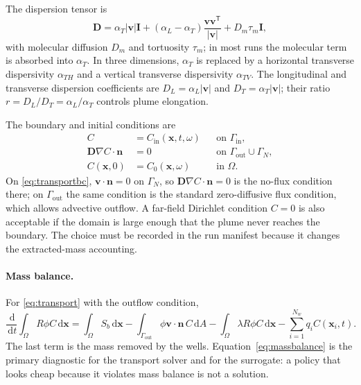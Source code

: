 \documentclass[11pt]{article}
\numberwithin{equation}{section}
\newcommand{\dd}{\,\mathrm{d}}
\newcommand{\abs}[1]{\left\lvert #1 \right\rvert}
\newcommand{\xx}{\mathbf{x}}
\newcommand{\vv}{\mathbf{v}}
\newcommand{\DD}{\mathbf{D}}
\newcommand{\nn}{\mathbf{n}}
\newcommand{\T}{\mathsf{T}}
\theoremstyle{plain}
\begin{document}
The dispersion tensor is
\begin{equation}
\label{eq:D2}
\DD=\alpha_T\abs{\vv}\mathbf{I}
+(\alpha_L-\alpha_T)\frac{\vv\vv^{\T}}{\abs{\vv}}
+D_m\tau_m\mathbf{I},
\end{equation}
with molecular diffusion $D_m$ and tortuosity $\tau_m$; in most runs the
molecular term is absorbed into $\alpha_T$.  In three dimensions,
$\alpha_T$ is replaced by a horizontal transverse dispersivity
$\alpha_{TH}$ and a vertical transverse dispersivity $\alpha_{TV}$.  The
longitudinal and transverse dispersion coefficients are
$D_L=\alpha_L\abs{\vv}$ and $D_T=\alpha_T\abs{\vv}$; their ratio
$r=D_L/D_T=\alpha_L/\alpha_T$ controls plume elongation.

The boundary and initial conditions are
\begin{equation}
\label{eq:transportbc}
\begin{aligned}
C&=C_{\mathrm{in}}(\xx,t,\omega)
&&\text{on }\Gamma_{\mathrm{in}},\\
\DD\nabla C\cdot\nn&=0
&&\text{on }\Gamma_{\mathrm{out}}\cup\Gamma_N,\\
C(\xx,0)&=C_0(\xx,\omega)&&\text{in }\Omega.
\end{aligned}
\end{equation}
On \eqref{eq:transportbc}, $\vv\cdot\nn=0$ on $\Gamma_N$, so
$\DD\nabla C\cdot\nn=0$ is the no-flux condition there; on
$\Gamma_{\mathrm{out}}$ the same condition is the standard zero-diffusive
flux condition, which allows advective outflow.  A far-field Dirichlet
condition $C=0$ is also acceptable if the domain is large enough that the
plume never reaches the boundary.  The choice must be recorded in the run
manifest because it changes the extracted-mass accounting.

\paragraph{Mass balance.}
For \eqref{eq:transport} with the outflow condition,
\begin{equation}
\label{eq:massbalance}
\frac{\dd}{\dd t}\int_\Omega R\phi C\dd\xx
=\int_\Omega S_b\dd\xx
-\int_{\Gamma_{\mathrm{out}}}\phi\vv\cdot\nn\,C\dd A
-\int_\Omega\lambda R\phi C\dd\xx
-\sum_{i=1}^{N_w}q_iC(\xx_i,t).
\end{equation}
The last term is the mass removed by the wells.  Equation~\eqref{eq:massbalance}
is the primary diagnostic for the transport solver and for the surrogate: a
policy that looks cheap because it violates mass balance is not a solution.
\end{document}
